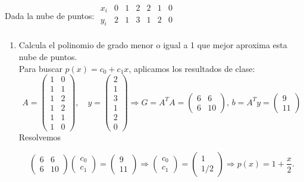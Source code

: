 \documentclass[12pt]{article}
\begin{document}
	\begin{ejercicio}[2 puntos]
		Dada la nube de puntos: 
		$\begin{array}{c|c|c|c|c|c|c}
			x_i & 0 & 1 & 2 & 2 & 1 & 0 \\
			\hline
			y_i & 2 & 1 & 3 & 1 & 2 & 0 \\
		\end{array}$
		
		\begin{enumerate}[label=\alph*)]
			\item Calcula el polinomio de grado menor o igual a 1 que mejor aproxima esta nube de puntos. \\
			
			Para buscar $p(x) = c_0 + c_1 x$, aplicamos los resultados de clase:
			$$
			A = 
			\begin{pmatrix}
				1 & 0 \\
				1 & 1 \\
				1 & 2 \\
				1 & 2 \\
				1 & 1 \\
				1 & 0
			\end{pmatrix}, \quad
			y =
			\begin{pmatrix}
				2 \\
				1 \\
				3 \\
				1 \\
				2 \\
				0 
			\end{pmatrix} \Rightarrow G = A^T A =
			\begin{pmatrix}
				6 & 6 \\
				6 & 10
			\end{pmatrix}, \,
			b = A^T y =
			\begin{pmatrix}
				9 \\
				11
			\end{pmatrix}
			$$
			Resolvemos
			
			$$\begin{pmatrix}
				6 & 6 \\
				6 & 10
			\end{pmatrix}
			\begin{pmatrix}
				c_0 \\
				c_1
			\end{pmatrix}=
			\begin{pmatrix}
				9 \\
				11
			\end{pmatrix} \Rightarrow
			\begin{pmatrix}
				c_0 \\
				c_1
			\end{pmatrix}=
			\begin{pmatrix}
				1 \\
				1/2
			\end{pmatrix} \Rightarrow
			p(x)=1+\frac{x}{2}. $$
			

\end{enumerate}
\end{ejercicio}
\end{document}
